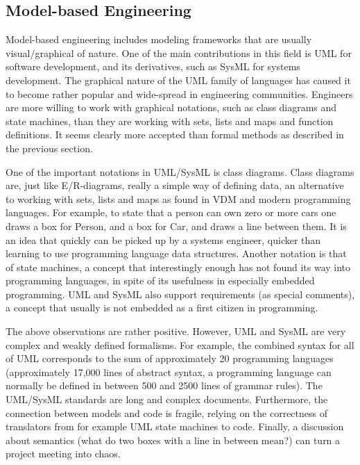 \subsection{Model-based Engineering}

Model-based engineering includes modeling frameworks that are 
usually visual/graphical of nature. One of the main contributions 
in this field is UML for software development, and its derivatives, 
such as SysML for systems development. The graphical nature of the 
UML family of languages has caused it to become rather popular and 
wide-spread in engineering communities. Engineers are more willing 
to work with graphical notations, such as 
class diagrams and state machines, than they are working with sets, 
lists and maps and function definitions. It seems clearly more 
accepted than formal methods as described in the previous section. 

One of the important notations in UML/SysML is class diagrams. 
Class diagrams are, just like E/R-diagrams, really a simple way 
of defining data, an alternative to working with sets, lists and 
maps as found in VDM and modern programming languages. For example, 
to state that a person can own zero or more cars one draws a box 
for Person, and a box for Car, and draws a line between them. It is 
an idea that quickly can be picked up by a systems engineer, 
quicker than learning to use programming language data structures. 
Another notation is that of state 
machines, a concept that interestingly enough has not found its way 
into programming languages, in spite of its usefulness in 
especially embedded programming. UML and SysML also support 
requirements (as special comments), a concept that usually is not embedded as a first citizen in programming. 

The above observations are rather positive. However, UML and
SysML are very complex and weakly defined formalisms. 
For example, the combined syntax for all of UML corresponds 
to the sum of approximately 20 programming languages (approximately 
17,000 lines of abstract syntax, a programming language can 
normally be defined in between 500 and 2500 lines of grammar 
rules). The UML/SysML standards are long and complex documents. 
Furthermore, the connection between models and code is fragile, relying on the correctness of translators from for example UML state machines to code. Finally, a discussion about semantics
(what do two boxes with a line in between mean?) can turn 
a project meeting into chaos.


